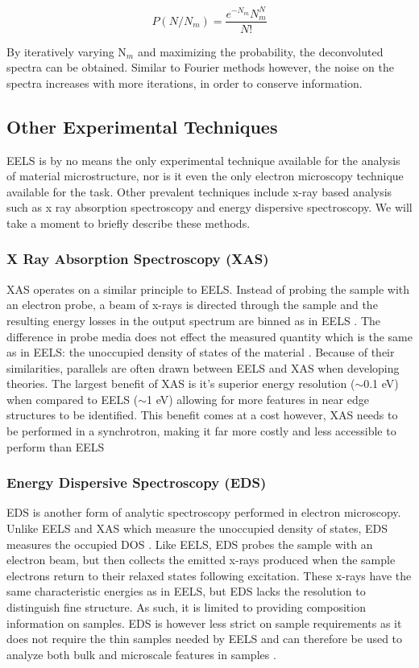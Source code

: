 \begin{equation}
	P (N/N_m) = \frac{e^{-N_m}N^N_m}{N!}
\end{equation}

By iteratively varying N$_m$ and maximizing the probability, the deconvoluted spectra can be obtained.  Similar to Fourier methods however, the noise on the spectra increases with more iterations, in order to conserve information.   


\subsection{Other Experimental Techniques}
EELS is by no means the only experimental technique available for the analysis of material microstructure, nor is it even the only electron microscopy technique available for the task. Other prevalent techniques include x-ray based analysis such as x ray absorption spectroscopy and energy dispersive spectroscopy.  We will take a moment to briefly describe these methods.

\subsubsection{X Ray Absorption Spectroscopy (XAS)}
XAS operates on a similar principle to EELS.  Instead of probing the sample with an electron probe, a beam of x-rays is directed through the sample and the resulting energy losses in the output spectrum are binned as in EELS \cite{groot_high-resolution_2001}.  The difference in probe media does not effect the measured quantity which is the same as in EELS: the unoccupied density of states of the material \cite{groot_high-resolution_2001}.  Because of their similarities, parallels are often drawn between EELS and XAS when developing theories.  The largest benefit of XAS is it's superior energy resolution ($\sim$0.1 eV) when compared to EELS ($\sim$1 eV) allowing for more features in near edge structures to be identified\cite{Egerton, groot_high-resolution_2001}.  This benefit comes at a cost however, XAS needs to be performed in a synchrotron, making it far more costly and less accessible to perform than EELS


\subsubsection{Energy Dispersive Spectroscopy (EDS)}
EDS is another form of analytic spectroscopy performed in electron microscopy.   Unlike EELS and XAS which measure the unoccupied density of states, EDS measures the occupied DOS \cite{goldstein_electron_2003}.  Like EELS, EDS probes the sample with an electron beam, but then collects the emitted x-rays produced when the sample electrons return to their relaxed states following excitation.  These x-rays have the same characteristic energies as in EELS, but EDS lacks the resolution to distinguish fine structure.  As such, it is limited to providing composition information on samples.  EDS is however less strict on sample requirements as it does not require the thin samples needed by EELS and can therefore be used to analyze both bulk and microscale features in samples \cite{goldstein_electron_2003}.

